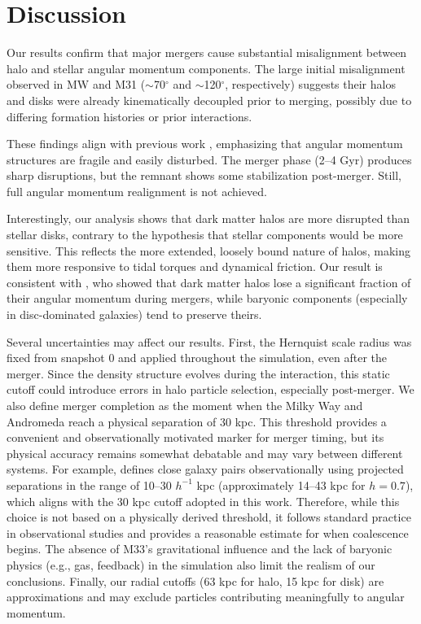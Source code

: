 \documentclass[twocolumn]{aastex631}
\begin{document}
\section{Discussion}

Our results confirm that major mergers cause substantial misalignment between halo and stellar angular momentum components. The large initial misalignment observed in MW and M31 ($\sim$70$^\circ$ and $\sim$120$^\circ$, respectively) suggests their halos and disks were already kinematically decoupled prior to merging, possibly due to differing formation histories or prior interactions.

These findings align with previous work \citep{Zavala2008}, emphasizing that angular momentum structures are fragile and easily disturbed. The merger phase (2–4 Gyr) produces sharp disruptions, but the remnant shows some stabilization post-merger. Still, full angular momentum realignment is not achieved.

Interestingly, our analysis shows that dark matter halos are more disrupted than stellar disks, contrary to the hypothesis that stellar components would be more sensitive. This reflects the more extended, loosely bound nature of halos, making them more responsive to tidal torques and dynamical friction. Our result is consistent with \cite{Zavala2008}, who showed that dark matter halos lose a significant fraction of their angular momentum during mergers, while baryonic components (especially in disc-dominated galaxies) tend to preserve theirs.

Several uncertainties may affect our results. First, the Hernquist scale radius was fixed from snapshot 0 and applied throughout the simulation, even after the merger. Since the density structure evolves during the interaction, this static cutoff could introduce errors in halo particle selection, especially post-merger. We also define merger completion as the moment when the Milky Way and Andromeda reach a physical separation of 30 kpc. This threshold provides a convenient and observationally motivated marker for merger timing, but its physical accuracy remains somewhat debatable and may vary between different systems. For example, \citet{Lotz2011} defines close galaxy pairs observationally using projected separations in the range of 10–30 $h^{-1}$ kpc (approximately 14–43 kpc for $h = 0.7$), which aligns with the 30 kpc cutoff adopted in this work. Therefore, while this choice is not based on a physically derived threshold, it follows standard practice in observational studies and provides a reasonable estimate for when coalescence begins.
 The absence of M33’s gravitational influence and the lack of baryonic physics (e.g., gas, feedback) in the simulation also limit the realism of our conclusions. Finally, our radial cutoffs (63 kpc for halo, 15 kpc for disk) are approximations and may exclude particles contributing meaningfully to angular momentum.
\end{document}

